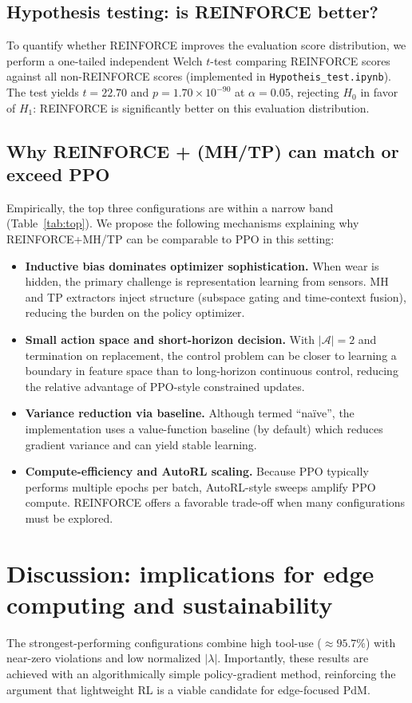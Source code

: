 \documentclass[11pt]{article}
\begin{document}
\subsection{Hypothesis testing: is REINFORCE better?}
To quantify whether \textsc{REINFORCE} improves the evaluation score distribution, we perform a one-tailed independent Welch $t$-test comparing \textsc{REINFORCE} scores against all non-\textsc{REINFORCE} scores (implemented in \texttt{Hypotheis\_test.ipynb}). The test yields $t=22.70$ and $p=1.70\times 10^{-90}$ at $\alpha=0.05$, rejecting $H_0$ in favor of $H_1$: \textsc{REINFORCE} is significantly better on this evaluation distribution.

\subsection{Why REINFORCE + (MH/TP) can match or exceed PPO}
Empirically, the top three configurations are within a narrow band (Table~\ref{tab:top}). We propose the following mechanisms explaining why \textsc{REINFORCE}+MH/TP can be comparable to \textsc{PPO} in this setting:
\begin{itemize}
  \item \textbf{Inductive bias dominates optimizer sophistication.} When wear is hidden, the primary challenge is representation learning from sensors. MH and TP extractors inject structure (subspace gating and time-context fusion), reducing the burden on the policy optimizer.
  \item \textbf{Small action space and short-horizon decision.} With $|\mathcal{A}|=2$ and termination on replacement, the control problem can be closer to learning a boundary in feature space than to long-horizon continuous control, reducing the relative advantage of PPO-style constrained updates.
  \item \textbf{Variance reduction via baseline.} Although termed ``na\"{i}ve'', the implementation uses a value-function baseline (by default) which reduces gradient variance and can yield stable learning.
  \item \textbf{Compute-efficiency and AutoRL scaling.} Because PPO typically performs multiple epochs per batch, AutoRL-style sweeps amplify PPO compute. REINFORCE offers a favorable trade-off when many configurations must be explored.
\end{itemize}

\section{Discussion: implications for edge computing and sustainability}
The strongest-performing configurations combine high tool-use (\(\approx 95.7\%\)) with near-zero violations and low normalized $|\lambda|$. Importantly, these results are achieved with an algorithmically simple policy-gradient method, reinforcing the argument that lightweight RL is a viable candidate for edge-focused PdM.
\end{document}
